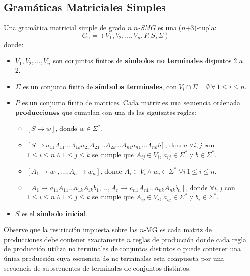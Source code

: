 \subsection{Gramáticas Matriciales Simples}

Una gramática matricial simple de grado $n$ \textit{$n$-SMG} es una ($n$+3)-tupla:
$$
    G_n=(V_1,V_2,\ldots,V_n,P,S,\Sigma)
$$
donde:
\begin{itemize}
    \item \( V_1, V_2, \ldots, V_n \) son conjuntos finitos de \textbf{símbolos no terminales} disjuntos 2 a 2.
    \item \( \Sigma \) es un conjunto finito de \textbf{símbolos terminales}, con \( V_i \cap \Sigma = \emptyset\,\forall\,1\leq i\leq n \).
    \item \( P \) es un conjunto finito de matrices. Cada matriz es una secuencia ordenada \textbf{producciones} que cumplan con una de las siguientes reglas:
          \begin{itemize}
              \item $[S\to w]$, donde $w\in \Sigma ^*$.
              \item $[S\to a_{11}A_{11}\ldots A_{1k}a_{21}A_{21}\ldots A_{2k}\ldots A_{n1}a_{n1}\ldots A_{nk}b]$,
                    donde $\forall i,j$ con $1\leq i\leq n\wedge 1\leq j\leq k$ se cumple que
                    $A_{ij}\in V_i$, $a_{ij}\in \Sigma ^*$ y $b\in \Sigma ^*$.
              \item $[A_1\to w_1,\ldots, A_n\to w_n]$, donde $A_i\in V_i\wedge w_i\in \Sigma ^*$ $\forall i\, 1\leq i\leq n$.
              \item $[A_1 \to a_{11}A_{11}\ldots a_{1k}A_{1k}b_1,\ldots,A_n \to a_{n1}A_{n1}\ldots a_{nk}A_{nk}b_n]$, donde $\forall i,j$
                    con $1\leq i\leq n\wedge 1\leq j\leq k$ se cumple que
                    $A_{ij}\in V_i$, $a_{ij}\in \Sigma ^*$ y $b_{i}\in \Sigma ^*$.
          \end{itemize}
    \item \( S \) es el \textbf{símbolo inicial}.
\end{itemize}


Observe que la restricción impuesta sobre las $n$-MG es cada matriz de producciones debe contener exactamente $n$ reglas de producción
donde cada regla de producción utiliza no terminales de conjuntos distintos o puede contener una única producción cuya secuencia de no terminales
esta compuesta por una secuencia de subsecuentes de terminales de conjuntos distintos.

